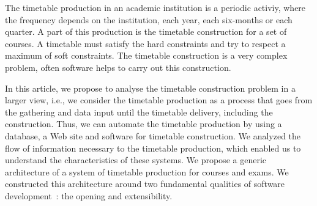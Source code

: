 The timetable production in an academic institution is a periodic
activiy, where the frequency depends on the institution, each
year, each six-months or each quarter. A part of this production
is the timetable construction for a set of courses. A timetable
must satisfy the hard constraints and try to respect a maximum of
soft constraints. The timetable construction is a very complex
problem, often software helps to carry out this construction.

In this article, we propose to analyse the timetable construction
problem in a larger view, i.e., we consider the timetable
production as a process that goes from the gathering and data
input until the timetable delivery, including the construction.
Thus, we can automate the timetable production by using a
database, a Web site and software for timetable construction. We
analyzed the flow of information necessary to the timetable
production, which enabled us to understand the characteristics of
these systems. We propose a generic architecture of a system of
timetable production for courses and exams. We constructed this
architecture around two fundamental qualities of software
development~: the opening and extensibility.
